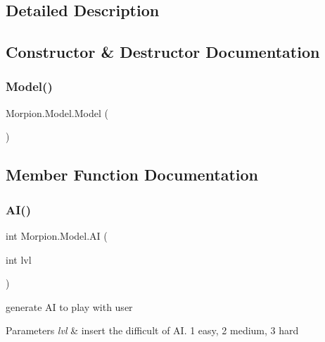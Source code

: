 \subsection{Detailed Description}




\subsection{Constructor \& Destructor Documentation}
\mbox{\label{class_morpion_1_1_model_a459b4901421170316a320d2e7d6408b4}} 
\subsubsection{\texorpdfstring{Model()}{Model()}}
{\footnotesize\ttfamily Morpion.\+Model.\+Model (\begin{DoxyParamCaption}{ }\end{DoxyParamCaption})}



\subsection{Member Function Documentation}
\mbox{\label{class_morpion_1_1_model_a02dd1ba77ebd6563c86164592b339ed0}} 
\subsubsection{\texorpdfstring{A\+I()}{AI()}}
{\footnotesize\ttfamily int Morpion.\+Model.\+AI (\begin{DoxyParamCaption}\item[{int}]{lvl }\end{DoxyParamCaption})}



generate AI to play with user 


\begin{DoxyParams}{Parameters}
{\em lvl} & insert the difficult of AI. 1 easy, 2 medium, 3 hard\\
\hline
\end{DoxyParams}
\mbox{\label{class_morpion_1_1_model_a76f2eb1ec20a4aa78cca17514a0b94e1}} 
